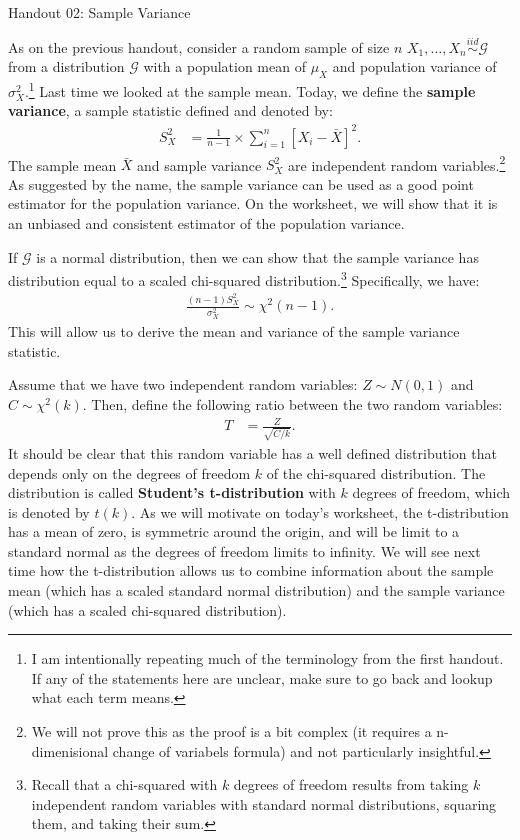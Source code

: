 \documentclass{tufte-handout}
\newcommand{\iid}{\stackrel{iid}{\sim}}
\begin{document}
\justify

{\LARGE Handout 02: Sample Variance}

\vspace*{18pt}

\noindent
As on the previous handout, consider a random sample of size $n$
$X_1, \ldots, X_n \iid \mathcal{G}$ from a distribution $\mathcal{G}$
with a population mean of $\mu_X$ and population variance of
$\sigma^2_X$.\footnote{
  I am intentionally repeating much of the terminology from the first handout.
  If any of the statements here are unclear, make sure to go back and lookup
  what each term means.
}
Last time we looked at the sample mean. Today, we define the
\textbf{sample variance}, a sample statistic defined and denoted by:
\begin{align*}
S^2_X &= \frac{1}{n - 1} \times \sum_{i=1}^n \left[ X_i - \bar{X} \right]^{2}.
\end{align*}
The sample mean $\bar{X}$ and sample variance $S^2_X$ are independent
random variables.\footnote{
  We will not prove this as the proof is a bit complex (it requires a n-dimenisional
  change of variabels formula) and not particularly insightful.
  }
As suggested by the name, the sample variance can be used as a good
point estimator for the population variance. On the worksheet, we will
show that it is an unbiased and consistent estimator of the population
variance.

If $\mathcal{G}$ is a normal distribution, then we can show that the
sample variance has distribution equal to a scaled chi-squared
distribution.\footnote{
  Recall that a chi-squared with $k$ degrees of freedom results from
  taking $k$ independent random variables with standard normal distributions,
  squaring them, and taking their sum.
}
Specifically, we have:
\begin{align*}
\frac{(n-1)S^2_X}{\sigma_X^2} \sim \chi^2(n-1).
\end{align*}
This will allow us to derive the mean and variance of the sample variance
statistic.

\vspace*{24pt}

\noindent
Assume that we have two independent random variables: $Z \sim N(0, 1)$ and
$C \sim \chi^2(k)$. Then, define the following ratio between the two random
variables:
\begin{align*}
T &= \frac{Z}{\sqrt{C / k}}.
\end{align*} 
It should be clear that this random variable has a well defined distribution that
depends only on the degrees of freedom $k$ of the chi-squared distribution. The
distribution is called \textbf{Student's t-distribution} with $k$ degrees of freedom,
which is denoted by $t(k)$. As we will motivate on today's worksheet, the t-distribution
has a mean of zero, is symmetric around the origin, and will be limit to a standard
normal as the degrees of freedom limits to infinity. We will see next time how the
t-distribution allows us to combine information about the sample mean (which has a
scaled standard normal distribution) and the sample variance (which has a scaled
chi-squared distribution).
\end{document}
